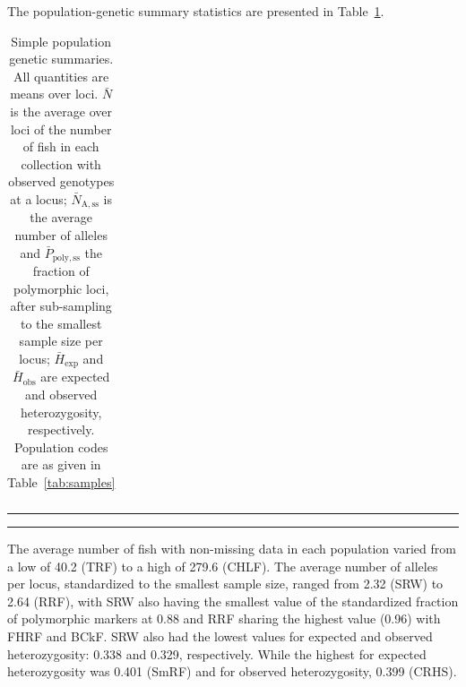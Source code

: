 The population-genetic summary statistics are presented in Table~\ref{tab:pg-summ}.
\begin{table}
\caption{\footnotesize Simple population genetic summaries. All quantities are means
over loci.  $\bar{N}$ is the average over loci of the number of fish in each collection with observed genotypes
at a locus; $\bar{N}_\mathrm{A,ss}$ is the
average number of alleles and $\bar{P}_\mathrm{poly,ss}$ the fraction of polymorphic loci,
after sub-sampling to the smallest sample size per locus; $\bar{H}_\mathrm{exp}$ and
$\bar{H}_\mathrm{obs}$ are expected and observed heterozygosity, respectively. Population
codes are as given in Table~\ref{tab:samples}}
\label{tab:pg-summ}
{\footnotesize
\begin{tabular*}{0.48\textwidth}{@{\extracolsep{\fill}} lrrrrr}
\hline\hline

\end{tabular*}
}
\vspace*{-2.3ex}\hrule width0.48\textwidth
\vspace*{0.3ex}\hrule width0.48\textwidth
\end{table}
The average number of fish with non-missing data in each population varied from
a low of 40.2 (TRF) to a high of 279.6 (CHLF).  The average number of alleles
per locus, standardized to the smallest sample size, ranged from 2.32 (SRW) to
2.64 (RRF), with  SRW also having the smallest value of the
standardized fraction of polymorphic markers at 0.88 and RRF sharing the highest value
(0.96) with FHRF and BCkF.
SRW also had the lowest values for expected and observed heterozygosity:
0.338 and 0.329, respectively. While the highest for expected heterozygosity
was 0.401 (SmRF) and for observed heterozygosity, 0.399 (CRHS).

